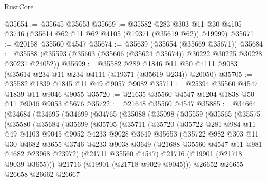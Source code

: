 \begin{lexlean}{RustCore}
\begin{coremodule}
@35654 := @35645 @35653
@35669 := @35582
    @283
    @303
    @11
    @30
    @4105
    @3746
    (@35614 @62 @11 @62 @4105 (@19371 (@35619 @62)) @19999)
@35671 := @20158 @35560 @4547
@35674 := @35639 (@35654 (@35669 @35671))
@35684 := @35588 (@35593 (@35603 (@35606 (@35624 @35674)) @30222 @30225 @30228 @30231 @24052))
@35699 := @35582
    @289
    @1846
    @11
    @50
    @4111
    @9083
    (@35614 @234 @11 @234 @4111 (@19371 (@35619 @234)) @20050)
@35705 := @35582 @1839 @1845 @11 @49 @9057 @9082
@35711 := @25394 @35560 @4547 @1839 @11 @9046 @9055
@35720 := @21635 @35560 @4547 @1204 @1838 @50 @11 @9046 @9053 @5676
@35722 := @21648 @35560 @4547
@35885 := @34664
    (@34684
      (@34695
        (@34699
          (@34765
            (@35088
              (@35098
                (@35559
                  (@35565
                    (@35575
                      (@35580
                        (@35684
                          (@35699
                            (@35705
                              (@35711
                                (@35720
                                  (@35722
                                    @281
                                    @984
                                    @11
                                    @49
                                    @4103
                                    @9045
                                    @9052
                                    @4233
                                    @9028
                                    @3649
                                    @35653
                                    (@35722
                                      @982
                                      @303
                                      @11
                                      @30
                                      @4682
                                      @3655
                                      @3746
                                      @4233
                                      @9038
                                      @3649
                                      (@21688 @35560 @4547 @11 @981 @4682 @23968 @23972)
                                      (@21711 @35560 @4547)
                                      @21716
                                      (@19901 (@21718 @9039 @3655)))
                                    @21716
                                    (@19901 (@21718 @9029 @9045)))
                                  @26652
                                  @26655
                                  @26658
                                  @26662
                                  @26667

\end{coremodule}
\end{lexlean}
